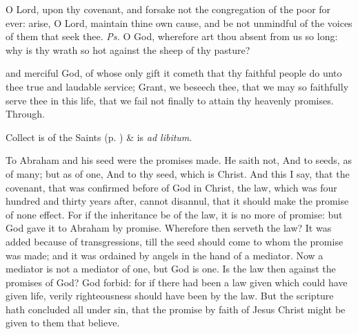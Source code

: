 


\properantiphonfix

\introit
{} O Lord, upon thy covenant, and forsake not the congregation of the poor for ever: arise, O Lord, maintain thine own cause, and be not unmindful of the voices of them that seek thee. \textit{Ps.} O God, wherefore art thou absent from us so long: why is thy wrath so hot against the sheep of thy pasture?

\collect
{} and merciful God, of whose only gift it cometh that thy faithful people do unto thee true and laudable service; Grant, we beseech thee, that we may so faithfully serve thee in this life, that we fail not finally to attain thy heavenly promises. Through.
\begin{rubric}
     Collect is of the Saints (p. \pageref{SPSaints}) \&  is \emph{ad libitum}.
\end{rubric}

 To Abraham and his seed were the promises made. He saith not, And to seeds, as of many; but as of one, And to thy seed, which is Christ. And this I say, that the covenant, that was confirmed before of God in Christ, the law, which was four hundred and thirty years after, cannot disannul, that it should make the promise of none effect. For if the inheritance be of the law, it is no more of promise: but God gave it to Abraham by promise. Wherefore then serveth the law? It was added because of transgressions, till the seed should come to whom the promise was made; and it was ordained by angels in the hand of a mediator. Now a mediator is not a mediator of one, but God is one. Is the law then against the promises of God? God forbid: for if there had been a law given which could have given life, verily righteousness should have been by the law. But the scripture hath concluded all under sin, that the promise by faith of Jesus Christ might be given to them that believe.


